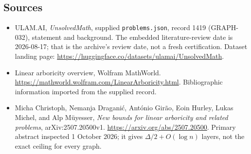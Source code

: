 \documentclass[11pt,a4paper]{article}
\begin{document}
\subsection{Sources}

{\small

\begin{itemize}

\item[\hypertarget{source:1419:1}{S1}] ULAM.AI, \emph{UnsolvedMath}, supplied \texttt{problems.json}, record 1419 (GRAPH-032), statement and background. The embedded literature-review date is 2026-08-17; that is the archive’s review date, not a fresh certification. Dataset landing page: \url{https://huggingface.co/datasets/ulamai/UnsolvedMath}.

\item[\hypertarget{source:1419:2}{S2}] Linear arboricity overview, Wolfram MathWorld. \url{https://mathworld.wolfram.com/LinearArboricity.html}. Bibliographic information imported from the supplied record.


\item[E1] Micha Christoph, Nemanja Dragani\'c,
Ant\'onio Gir\~ao, Eoin Hurley, Lukas Michel, and Alp M\"uyesser,
\emph{New bounds for linear arboricity and related problems},
arXiv:2507.20500v1. \url{https://arxiv.org/abs/2507.20500}.
Primary abstract inspected 1 October 2026; it gives
$\Delta/2+O(\log n)$ layers, not the exact ceiling for every graph.

\end{itemize}

}

\label{end:1419}
\end{document}
